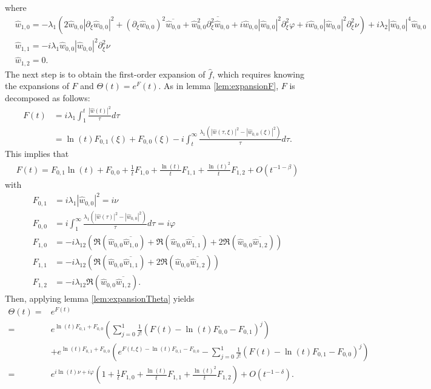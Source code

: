 \documentclass[a4paper, 15pt]{article}
\numberwithin{equation}{section}
\begin{document}
where
\begin{align*}
&\hat{w}_{1,0}=-\lambda_1(2\hat{w}_{0,0}|\partial_\xi\hat{w}_{0,0}|^2+(\partial_\xi\hat{w}_{0,0})^2\overline{\hat{w}_{0,0}}+\hat{w}_{0,0}^2\overline{\partial_\xi^2\hat{w}_{0,0}}+i\hat{w}_{0,0}|\hat{w}_{0,0}|^2\partial^2_\xi\varphi+i\hat{w}_{0,0}|\hat{w}_{0,0}|^2\partial^2_\xi\nu)+i\lambda_2|\hat{w}_{0,0}|^4\hat{w}_{0,0}\\
&\hat{w}_{1,1}=-i\lambda_1\hat{w}_{0,0}|\hat{w}_{0,0}|^2\partial^2_\xi\nu\\
&\hat{w}_{1,2}=0.
\end{align*}
The next step is to obtain the first-order expansion of $\hat{f}$, which requires knowing the expansions of $F$ and $\Theta(t)=e^{F}(t)$.
As in lemma \ref{lem:expansionF}, $F$ is decomposed as follows:
\begin{align*}
F(t)&=i\lambda_1\int^t_1\frac{|\hat{w}(t)|^2}{\tau}d\tau\\
&=\ln(t)F_{0,1}(\xi)+F_{0,0}(\xi)-i\int^\infty_t\frac{\lambda_1(|\hat{w}(\tau,\xi)|^2-|\hat{w}_{0,0}(\xi)|^2)}{\tau}d\tau.
\end{align*}
This implies that 
\begin{align}
F(t)=F_{0,1}\ln(t)+F_{0,0}+\frac{1}{t}F_{1,0}+\frac{\ln(t)}{t}F_{1,1}+\frac{\ln(t)^2}{t}F_{1,2}+O(t^{-1-\beta})
\end{align}
with
\begin{align*}
F_{0,1}&=i\lambda_1|\hat{w}_{0,0}|^2=i\nu\\
F_{0,0}&=i\int^\infty_1\frac{\lambda_1(|\hat{w}(\tau)|^2-|\hat{w}_{0,0}|^2)}{\tau}d\tau=i\varphi\\
F_{1,0}&=-i\lambda_12(\Re(\hat{w}_{0,0}\overline{\hat{w}_{1,0}})+\Re(\hat{w}_{0,0}\overline{\hat{w}_{1,1}})+2\Re(\hat{w}_{0,0}\overline{\hat{w}_{1,2}}))\\
F_{1,1}&=-i\lambda_12(\Re(\hat{w}_{0,0}\overline{\hat{w}_{1,1}})+2\Re(\hat{w}_{0,0}\overline{\hat{w}_{1,2}}))\\
F_{1,2}&=-i\lambda_12\Re(\hat{w}_{0,0}\overline{\hat{w}_{1,2}}).
\end{align*}
Then, applying lemma \ref{lem:expansionTheta} yields
\begin{align*}
\Theta(t)=&e^{F(t)}\\
=&e^{\ln(t)F_{0,1}+F_{0,0}}(\sum_{j=0}^1\frac{1}{j!}\left(F(t)-\ln(t)F_{0,0}-F_{0,1}\right)^j)\\
&+e^{\ln(t)F_{0,1}+F_{0,0}}(e^{F(t,\xi)-\ln(t)F_{0,1}-F_{0,0}}-\sum_{j=0}^1\frac{1}{j!}\left(F(t)-\ln(t)F_{0,1}-F_{0,0}\right)^j)\\
=&e^{i\ln(t)\nu+i\varphi}(1+\frac{1}{t}F_{1,0}+\frac{\ln(t)}{t}F_{1,1}+\frac{\ln(t)^2}{t}F_{1,2})+O(t^{-1-\delta}).
\end{align*}
\end{document}
